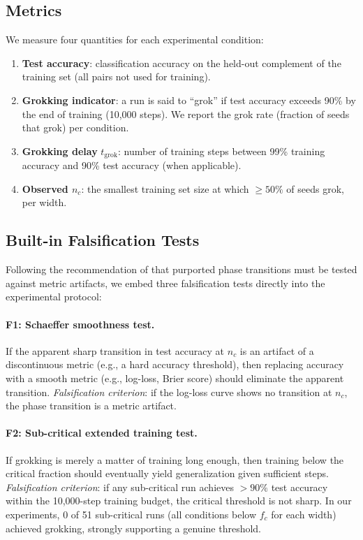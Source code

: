 \documentclass{article}
\newcommand{\nc}{n_c}
\begin{document}
\subsection{Metrics}

We measure four quantities for each experimental condition:
\begin{enumerate}
    \item \textbf{Test accuracy}: classification accuracy on the held-out complement of the training set (all pairs not used for training).
    \item \textbf{Grokking indicator}: a run is said to ``grok'' if test accuracy exceeds 90\% by the end of training (10{,}000 steps). We report the grok rate (fraction of seeds that grok) per condition.
    \item \textbf{Grokking delay} $t_{\text{grok}}$: number of training steps between 99\% training accuracy and 90\% test accuracy (when applicable).
    \item \textbf{Observed $\nc$}: the smallest training set size at which $\geq 50\%$ of seeds grok, per width.
\end{enumerate}

\subsection{Built-in Falsification Tests}
\label{sec:falsification}

Following the recommendation of \citet{schaeffer2024emergent} that purported phase transitions must be tested against metric artifacts, we embed three falsification tests directly into the experimental protocol:

\paragraph{F1: Schaeffer smoothness test.}
If the apparent sharp transition in test accuracy at $\nc$ is an artifact of a discontinuous metric (e.g., a hard accuracy threshold), then replacing accuracy with a smooth metric (e.g., log-loss, Brier score) should eliminate the apparent transition.
\emph{Falsification criterion}: if the log-loss curve shows no transition at $\nc$, the phase transition is a metric artifact.

\paragraph{F2: Sub-critical extended training test.}
If grokking is merely a matter of training long enough, then training below the critical fraction should eventually yield generalization given sufficient steps.
\emph{Falsification criterion}: if any sub-critical run achieves $>90\%$ test accuracy within the 10{,}000-step training budget, the critical threshold is not sharp.
In our experiments, 0 of 51 sub-critical runs (all conditions below $f_c$ for each width) achieved grokking, strongly supporting a genuine threshold.
\end{document}
